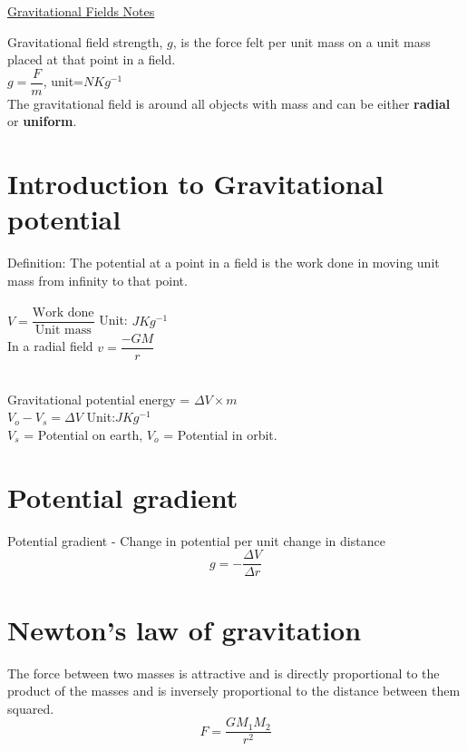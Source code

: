 \documentclass{article}[18pt]
\begin{document}
\begin{center}
\underline{\huge Gravitational Fields Notes}
\end{center}
Gravitational field strength, $g$, is the force felt per unit mass on a unit mass placed at that point in a field.\\
$g=\dfrac{F}{m}$, unit=$NKg^{-1}$\\
The gravitational field is around all objects with mass and can be either \textbf{radial} or \textbf{uniform}.
\section{Introduction to Gravitational potential}
Definition: The potential at a point in a field is the work done in moving unit mass from infinity to that point.\\
\\
$V=\dfrac{\text{Work done}}{\text{Unit mass}}$ Unit: $JKg^{-1}$\\
In a radial field $v=\dfrac{-GM}{r}$\\
\\
Gravitational potential energy = $\Delta V\times m$\\
$V_o-V_s=\Delta V$ Unit:$JKg^{-1}$\\
$V_s$ = Potential on earth, $V_o$ = Potential in orbit.
\section{Potential gradient}
Potential gradient - Change in potential per unit change in distance
$$g=-\frac{\Delta V}{\Delta r}$$
\section{Newton's law of gravitation}
The force between two masses is attractive and is directly proportional to the product of the masses and is inversely proportional to the distance between them squared.
$$F=\frac{GM_1M_2}{r^2}$$
\end{document}
